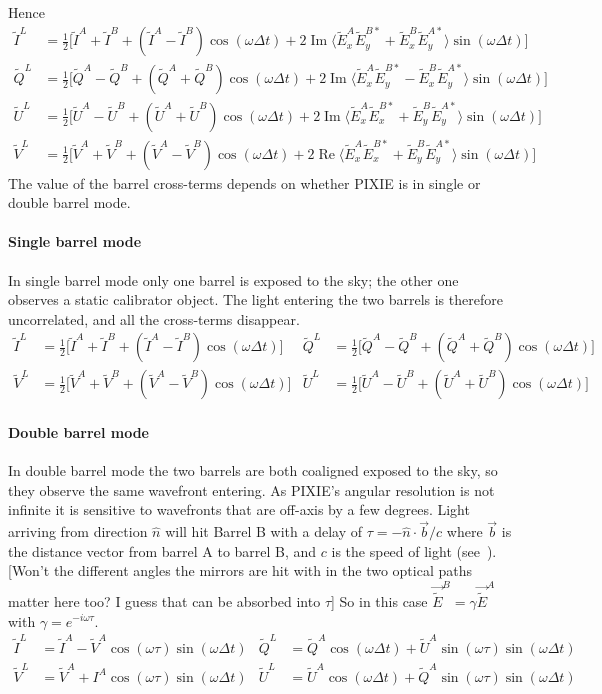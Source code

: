 \documentclass{article}
\newcommand{\I}{\tilde I}
\newcommand{\Q}{\tilde Q}
\newcommand{\U}{\tilde U}
\newcommand{\V}{\tilde V}
\newcommand{\J}{{\tilde E}}
\renewcommand{\Re}{\operatorname{Re}}
\renewcommand{\Im}{\operatorname{Im}}
\begin{document}
Hence
\begin{align}
	\I^L &= \frac12\big[\I^A+\I^B+(\I^A-\I^B)\cos(\omega\Delta t)
		+2\Im\langle\J^A_x\J^{B*}_y+\J^B_x\J^{A*}_y\rangle\sin(\omega\Delta t) \big] \\
	\Q^L &= \frac12\big[\Q^A-\Q^B+(\Q^A+\Q^B)\cos(\omega\Delta t)
		+2\Im\langle\J^A_x\J^{B*}_y-\J^B_x\J^{A*}_y\rangle\sin(\omega\Delta t) \big] \\
	\U^L &= \frac12\big[\U^A-\U^B+(\U^A+\U^B)\cos(\omega\Delta t)
		+2\Im\langle\J^A_x\J^{B*}_x+\J^B_y\J^{A*}_y\rangle\sin(\omega\Delta t) \big] \\
	\V^L &= \frac12\big[\V^A+\V^B+(\V^A-\V^B)\cos(\omega\Delta t)
		+2\Re\langle\J^A_x\J^{B*}_x+\J^B_y\J^{A*}_y\rangle\sin(\omega\Delta t) \big]
\end{align}
The value of the barrel cross-terms depends on whether PIXIE is in single
or double barrel mode.

\paragraph{Single barrel mode}
In single barrel mode only one barrel is exposed to the sky; the other one
observes a static calibrator object. The light entering the two barrels is
therefore uncorrelated, and all the cross-terms disappear.
\begin{align}
	\I^L &= \frac12\big[\I^A+\I^B+(\I^A-\I^B)\cos(\omega\Delta t)\big] &
	\Q^L &= \frac12\big[\Q^A-\Q^B+(\Q^A+\Q^B)\cos(\omega\Delta t)\big] \\
	\V^L &= \frac12\big[\V^A+\V^B+(\V^A-\V^B)\cos(\omega\Delta t)\big] &
	\U^L &= \frac12\big[\U^A-\U^B+(\U^A+\U^B)\cos(\omega\Delta t)\big]
\end{align}

\paragraph{Double barrel mode}
In double barrel mode the two barrels are both coaligned exposed to the sky,
so they observe the same wavefront entering. As PIXIE's angular resolution is
not infinite it is sensitive to wavefronts that are off-axis by a few degrees.
Light arriving from direction $\hat n$ will hit Barrel B with a delay
of $\tau = -\hat n \cdot \vec b / c$ where $\vec b$ is the distance vector from
barrel A to barrel B, and $c$ is the speed of light (see~\cite{pixie_array}).
[Won't the different angles the mirrors are hit with in the two optical paths
matter here too? I guess that can be absorbed into $\tau$]
So in this case $\vec \J^B = \gamma \vec\J^A$ with $\gamma = e^{-i\omega\tau}$.
\begin{align}
	\I^L &= \I^A-\V^A\cos(\omega\tau)\sin(\omega\Delta t) &
	\Q^L &= \Q^A\cos(\omega\Delta t)+\U^A\sin(\omega\tau)\sin(\omega\Delta t) \\
	\V^L &= \V^A+I^A\cos(\omega\tau)\sin(\omega\Delta t) &
	\U^L &= \U^A\cos(\omega\Delta t)+\Q^A\sin(\omega\tau)\sin(\omega\Delta t)
\end{align}
\end{document}

